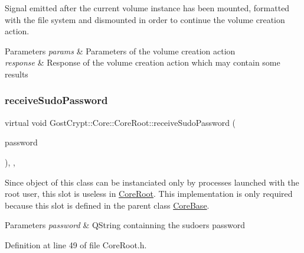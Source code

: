 Signal emitted after the current volume instance has been mounted, formatted with the file system and dismounted in order to continue the volume creation action. 


\begin{DoxyParams}{Parameters}
{\em params} & Parameters of the volume creation action \\
\hline
{\em response} & Response of the volume creation action which may contain some results \\
\hline
\end{DoxyParams}
\mbox{\label{class_gost_crypt_1_1_core_1_1_core_root_a74ce55bc5d2cc8c1c13ec48c81aa84ce}} 
\subsubsection{\texorpdfstring{receive\+Sudo\+Password}{receiveSudoPassword}}
{\footnotesize\ttfamily virtual void Gost\+Crypt\+::\+Core\+::\+Core\+Root\+::receive\+Sudo\+Password (\begin{DoxyParamCaption}\item[{Q\+String}]{password }\end{DoxyParamCaption})\hspace{0.3cm}{\ttfamily [inline]}, {\ttfamily [virtual]}, {\ttfamily [slot]}}



Since object of this class can be instanciated only by processes launched with the root user, this slot is useless in \hyperlink{class_gost_crypt_1_1_core_1_1_core_root}{Core\+Root}. This implementation is only required because this slot is defined in the parent class \hyperlink{class_gost_crypt_1_1_core_1_1_core_base}{Core\+Base}. 


\begin{DoxyParams}{Parameters}
{\em password} & Q\+String containning the sudoer\textquotesingle{}s password \\
\hline
\end{DoxyParams}


Definition at line 49 of file Core\+Root.\+h.

\mbox{\label{class_gost_crypt_1_1_core_1_1_core_root_a99a63ffb40e076362f1d0aee5df34dbd}} 
